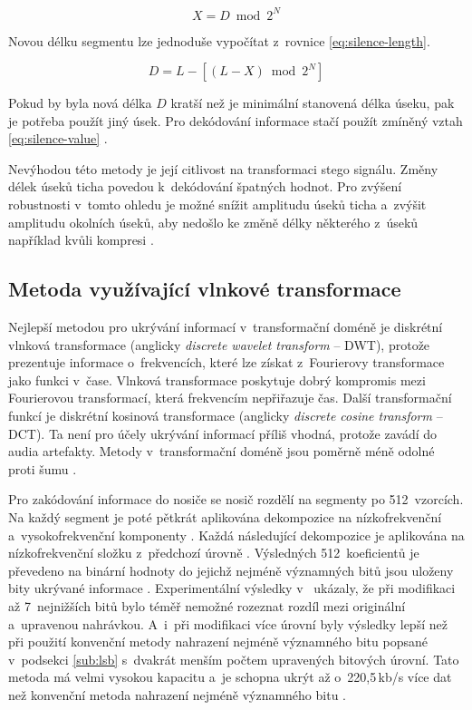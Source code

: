 \begin{equation}
    \label{eq:silence-value}
    X = D \bmod 2^N
\end{equation}

\noindent Novou délku segmentu lze jednoduše vypočítat z~rovnice
\ref{eq:silence-length}.

\begin{equation}
    \label{eq:silence-length}
    D = L - [(L - X) \bmod 2^N]
\end{equation}

\noindent Pokud by byla nová délka $D$ kratší než je minimální stanovená délka
úseku, pak je potřeba použít jiný úsek. Pro dekódování informace stačí použít
zmíněný vztah \ref{eq:silence-value} \cite{Shahreza2008}.

Nevýhodou této metody je její citlivost na transformaci stego signálu. Změny
délek úseků ticha povedou k~dekódování špatných hodnot. Pro zvýšení robustnosti
v~tomto ohledu je možné snížit amplitudu úseků ticha a~zvýšit amplitudu
okolních úseků, aby nedošlo ke změně délky některého z~úseků například kvůli
kompresi \cite{Djebbar2012}.

\subsection*{Metoda využívající vlnkové transformace}
\label{sub:wavelet-transform}

Nejlepší metodou pro ukrývání informací v~transformační doméně je diskrétní
vlnková transformace (anglicky \textit{discrete wavelet transform} -- DWT),
protože prezentuje informace o~frekvencích, které lze získat z~Fourierovy
transformace jako funkci v~čase. Vlnková transformace poskytuje dobrý kompromis
mezi Fourierovou transformací, která frekvencím nepřiřazuje čas. Další
transformační funkcí je diskrétní kosinová transformace (anglicky
\textit{discrete cosine transform} -- DCT). Ta není pro účely ukrývání
informací příliš vhodná, protože zavádí do audia artefakty. Metody
v~transformační doméně jsou poměrně méně odolné proti šumu \cite{Dutta2020}.

Pro zakódování informace do nosiče se nosič rozdělí na segmenty po
512~vzorcích. Na každý segment je poté pětkrát aplikována dekompozice na
nízkofrekvenční a~vysokofrekvenční komponenty \cite{Cvejic2002Wavelet}. Každá
následující dekompozice je aplikována na nízkofrekvenční složku z~předchozí
úrovně \cite{Prabakaran2012}. Výsledných 512~koeficientů je převedeno na
binární hodnoty do jejichž nejméně významných bitů jsou uloženy bity ukrývané
informace \cite{Cvejic2002Wavelet}. Experimentální výsledky
v~\cite{Cvejic2002Wavelet} ukázaly, že při modifikaci až 7~nejnižších bitů bylo
téměř nemožné rozeznat rozdíl mezi originální a~upravenou nahrávkou. A~i~při
modifikaci více úrovní byly výsledky lepší než při použití konvenční metody
nahrazení nejméně významného bitu popsané v~podsekci \ref{sub:lsb} s~dvakrát
menším počtem upravených bitových úrovní. Tato metoda má velmi vysokou kapacitu
a~je schopna ukrýt až o~220,5\,kb/s více dat než konvenční metoda nahrazení
nejméně významného bitu \cite{Cvejic2002Wavelet}.

